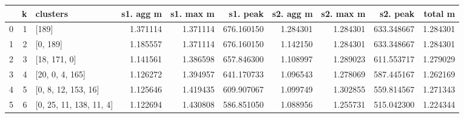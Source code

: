 \begin{tabular}{lrlrrrrrrr}
\toprule
{} &  k &                 clusters &  s1. agg m &  s1. max m &    s1. peak &  s2. agg m &  s2. max m &    s2. peak &   total m \\
\midrule
0 &  1 &                    [189] &   1.371114 &   1.371114 &  676.160150 &   1.284301 &   1.284301 &  633.348667 &  1.284301 \\
1 &  2 &                 [0, 189] &   1.185557 &   1.371114 &  676.160150 &   1.142150 &   1.284301 &  633.348667 &  1.284301 \\
2 &  3 &             [18, 171, 0] &   1.141561 &   1.386598 &  657.846300 &   1.108997 &   1.289023 &  611.553717 &  1.279029 \\
3 &  4 &          [20, 0, 4, 165] &   1.126272 &   1.394957 &  641.170733 &   1.096543 &   1.278069 &  587.445167 &  1.262169 \\
4 &  5 &      [0, 8, 12, 153, 16] &   1.125646 &   1.419435 &  609.907067 &   1.099749 &   1.302855 &  559.814567 &  1.271343 \\
5 &  6 &  [0, 25, 11, 138, 11, 4] &   1.122694 &   1.430808 &  586.851050 &   1.088956 &   1.255731 &  515.042300 &  1.224344 \\
\bottomrule
\end{tabular}
